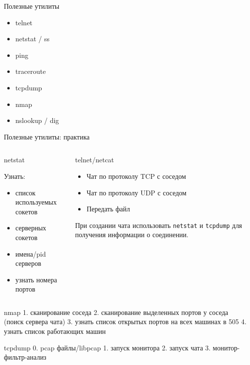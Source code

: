 \begin{frame}{Полезные утилиты}
	\begin{center}
		\begin{itemize}
			\item telnet
			\item netstat / ss
			\item ping
			\item traceroute
			\item tcpdump
			\item nmap
			\item nslookup / dig
		\end{itemize}
	\end{center}

\end{frame}


\begin{frame}{Полезные утилиты: практика}

	\begin{columns}
		\begin{block}{netstat}

			Узнать:
			\begin{itemize}
				\item список используемых сокетов
				\item серверных сокетов
				\item имена/pid серверов
				\item узнать номера портов
			\end{itemize}
		\end{block}
	
		\pause
		\begin{block}{telnet/netcat}

			\begin{itemize}
				\item Чат по протоколу TCP с соседом
				\item Чат по протоколу UDP с соседом
				\item Передать файл
			\end{itemize}
	
			При создании чата использовать {\tt netstat} и {\tt tcpdump}
			для получения информации о соединении.
		\end{block}
	
	\end{columns}
\end{frame}

nmap
1. сканирование соседа
2. сканирование выделенных портов у соседа (поиск сервера чата) 
3. узнать список открытых портов на всех машинах в 505
4. узнать список  работающих машин

tcpdump
0. pcap файлы/libpcap
1. запуск монитора
2. запуск чата
3. монитор-фильтр-анализ

